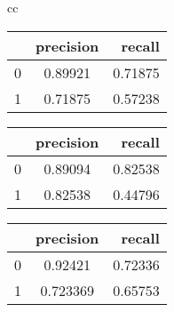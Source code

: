

\begin{tabular}{cc}    
    \begin{minipage}{.33\linewidth}
        \begin{center}
            \begin{tabular}{ | l | c | r | }
              \hline
               & precision & recall \\ \hline
              0 & 0.89921 & 0.71875 \\ \hline
              1 & 0.71875 & 0.57238 \\
              \hline
            \end{tabular}
        \end{center}
    \end{minipage}

    \begin{minipage}{.33\linewidth}
        \begin{center}
            \begin{tabular}{ | l | c | r | }
              \hline
               & precision & recall \\ \hline
              0 & 0.89094 & 0.82538 \\ \hline
              1 & 0.82538 & 0.44796 \\
              \hline
            \end{tabular}
        \end{center}
    \end{minipage}

    \begin{minipage}{0.33\textwidth}
        \begin{center}
            \begin{tabular}{ | l | c | r | }
              \hline
               & precision & recall \\ \hline
              0 & 0.92421 & 0.72336 \\ \hline
              1 & 0.723369 & 0.65753 \\
              \hline
            \end{tabular}
        \end{center}
    \end{minipage}
\end{tabular}

